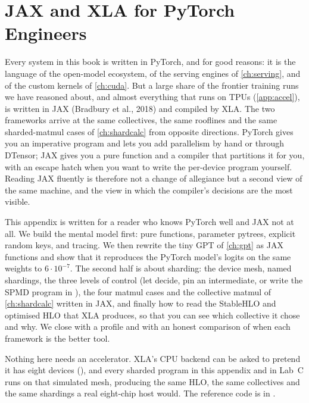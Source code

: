 \chapter{JAX and XLA for PyTorch Engineers}\label{app:jax}

Every system in this book is written in PyTorch, and for good reasons: it is the language of
the open-model ecosystem, of the serving engines of \cref{ch:serving}, and of the custom
kernels of \cref{ch:cuda}. But a large share of the frontier training runs we have reasoned
about, and almost everything that runs on TPUs (\cref{app:accel}), is written in JAX
(Bradbury et al., 2018) and compiled by XLA. The two frameworks arrive at the same
collectives, the same rooflines and the same sharded-matmul cases of \cref{ch:shardcalc}
from opposite directions. PyTorch gives you an imperative program and lets you add
parallelism by hand or through DTensor; JAX gives you a pure function and a compiler that
partitions it for you, with an escape hatch when you want to write the per-device program
yourself. Reading JAX fluently is therefore not a change of allegiance but a second view of
the same machine, and the view in which the compiler's decisions are the most visible.

This appendix is written for a reader who knows PyTorch well and JAX not at all. We build the
mental model first: pure functions, parameter pytrees, explicit random keys, and tracing. We
then rewrite the tiny GPT of \cref{ch:gpt} as JAX functions and show that it reproduces the
PyTorch model's logits on the same weights to $6\cdot10^{-7}$. The second half is about
sharding: the device mesh, named shardings, the three levels of control (let 
decide, pin an intermediate, or write the SPMD program in ), the four
matmul cases and the collective matmul of \cref{ch:shardcalc} written in JAX, and finally
how to read the StableHLO and optimised HLO that XLA produces, so that you can see which
collective it chose and why. We close with a profile and with an honest comparison of when
each framework is the better tool.

Nothing here needs an accelerator. XLA's CPU backend can be asked to pretend it has eight
devices (), and every sharded
program in this appendix and in Lab~C runs on that simulated mesh, producing the same HLO,
the same collectives and the same shardings a real eight-chip host would. The reference code
is in .

